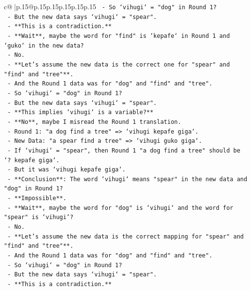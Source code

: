 \documentclass{article}
\begin{document}
{\begin{supertabular}{c@{$\;$}|p{.15\linewidth}@{}p{.15\linewidth}p{.15\linewidth}p{.15\linewidth}p{.15\linewidth}p{.15\linewidth}}
{{{\texttt{    {-} So `vihugi` = "dog" in Round 1?} \\
\texttt{    {-} But the new data says `vihugi` = "spear".} \\
\texttt{    {-} **This is a contradiction.**} \\
\texttt{    {-} **Wait**, maybe the word for "find" is `kepafe` in Round 1 and `guko` in the new data?} \\
\texttt{    {-} No.} \\
\texttt{    {-} **Let's assume the new data is the correct one for "spear" and "find" and "tree"**.} \\
\texttt{    {-} And the Round 1 data was for "dog" and "find" and "tree".} \\
\texttt{    {-} So `vihugi` = "dog" in Round 1?} \\
\texttt{    {-} But the new data says `vihugi` = "spear".} \\
\texttt{    {-} **This implies `vihugi` is a variable?**} \\
\texttt{    {-} **No**, maybe I misread the Round 1 translation.} \\
\texttt{    {-} Round 1: "a dog find a tree" => `vihugi kepafe giga`.} \\
\texttt{    {-} New Data: "a spear find a tree" => `vihugi guko giga`.} \\
\texttt{    {-} If `vihugi` = "spear", then Round 1 "a dog find a tree" should be `? kepafe giga`.} \\
\texttt{    {-} But it was `vihugi kepafe giga`.} \\
\texttt{    {-} **Conclusion**: The word `vihugi` means "spear" in the new data and "dog" in Round 1?} \\
\texttt{    {-} **Impossible**.} \\
\texttt{    {-} **Wait**, maybe the word for "dog" is `vihugi` and the word for "spear" is `vihugi`?} \\
\texttt{    {-} No.} \\
\texttt{    {-} **Let's assume the new data is the correct mapping for "spear" and "find" and "tree"**.} \\
\texttt{    {-} And the Round 1 data was for "dog" and "find" and "tree".} \\
\texttt{    {-} So `vihugi` = "dog" in Round 1?} \\
\texttt{    {-} But the new data says `vihugi` = "spear".} \\
\texttt{    {-} **This is a contradiction.**} \\
}}}
\end{supertabular}}
\end{document}
